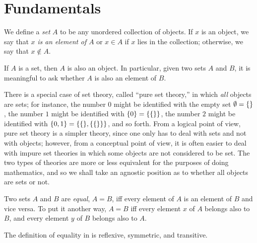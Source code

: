 \section{Fundamentals}\label{i:sec:3.1}

\begin{defn}\label{i:3.1.1}
  We define a \emph{set} \(A\) to be any unordered collection of objects.
  If \(x\) is an object, we say that \emph{\(x\) is an element of \(A\)} or \(x \in A\) if \(x\) lies in the collection;
  otherwise, we say that \(x \notin A\).
\end{defn}

\begin{ax}\label{i:3.1}
  If \(A\) is a set, then \(A\) is also an object.
  In particular, given two sets \(A\) and \(B\), it is meaningful to ask whether \(A\) is also an element of \(B\).
\end{ax}

\setcounter{thm}{2}
\begin{rmk}\label{i:3.1.3}
  There is a special case of set theory, called ``pure set theory,'' in which \emph{all} objects are sets;
  for instance, the number \(0\) might be identified with the empty set \(\emptyset = \left\lbrace\right\rbrace\), the number \(1\) might be identified with \(\left\lbrace0\right\rbrace = \left\lbrace\left\lbrace\right\rbrace\right\rbrace\), the number \(2\) might be identified with \(\set{0, 1} = \set{\set{}, \set{\set{}}}\), and so forth.
  From a logical point of view, pure set theory is a simpler theory, since one only has to deal with sets and not with objects;
  however, from a conceptual point of view, it is often easier to deal with impure set theories in which some objects are not considered to be set.
  The two types of theories are more or less equivalent for the purposes of doing mathematics, and so we shall take an agnostic position as to whether all objects are sets or not.
\end{rmk}

\begin{defn}\label{i:3.1.4}
  Two sets \(A\) and \(B\) are \emph{equal}, \(A = B\), iff every element of \(A\) is an element of \(B\) and vice versa.
  To put it another way, \(A = B\) iff every element \(x\) of \(A\) belongs also to \(B\), and every element \(y\) of \(B\) belongs also to \(A\).
\end{defn}

\begin{ac}\label{i:ac:3.1.1}
  The definition of equality in  is reflexive, symmetric, and transitive.
\end{ac}

